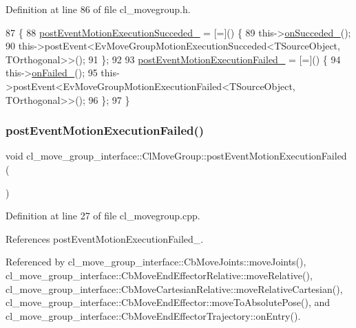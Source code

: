 Definition at line 86 of file cl\+\_\+movegroup.\+h.


\begin{DoxyCode}
87   \{
88     \hyperlink{classcl__move__group__interface_1_1ClMoveGroup_a1e95dacf3393a4e4eff40395e8edfccd}{postEventMotionExecutionSucceded\_} = [=]() \{
89       this->\hyperlink{classcl__move__group__interface_1_1ClMoveGroup_aefc24baaaed9ac7615f4dca20b8a077e}{onSucceded\_}();
90       this->postEvent<EvMoveGroupMotionExecutionSucceded<TSourceObject, TOrthogonal>>();
91     \};
92 
93     \hyperlink{classcl__move__group__interface_1_1ClMoveGroup_ae7ade7ead3390b444ad4f802de1ec62d}{postEventMotionExecutionFailed\_} = [=]() \{
94       this->\hyperlink{classcl__move__group__interface_1_1ClMoveGroup_a3e0ea6acf70a0c527864b712b215033b}{onFailed\_}();
95       this->postEvent<EvMoveGroupMotionExecutionFailed<TSourceObject, TOrthogonal>>();
96     \};
97   \}
\end{DoxyCode}
\mbox{\label{classcl__move__group__interface_1_1ClMoveGroup_a39dc3871d29b2af1ab739057f6ca6daa}} 
\subsubsection{\texorpdfstring{post\+Event\+Motion\+Execution\+Failed()}{postEventMotionExecutionFailed()}}
{\footnotesize\ttfamily void cl\+\_\+move\+\_\+group\+\_\+interface\+::\+Cl\+Move\+Group\+::post\+Event\+Motion\+Execution\+Failed (\begin{DoxyParamCaption}{ }\end{DoxyParamCaption})}



Definition at line 27 of file cl\+\_\+movegroup.\+cpp.



References post\+Event\+Motion\+Execution\+Failed\+\_\+.



Referenced by cl\+\_\+move\+\_\+group\+\_\+interface\+::\+Cb\+Move\+Joints\+::move\+Joints(), cl\+\_\+move\+\_\+group\+\_\+interface\+::\+Cb\+Move\+End\+Effector\+Relative\+::move\+Relative(), cl\+\_\+move\+\_\+group\+\_\+interface\+::\+Cb\+Move\+Cartesian\+Relative\+::move\+Relative\+Cartesian(), cl\+\_\+move\+\_\+group\+\_\+interface\+::\+Cb\+Move\+End\+Effector\+::move\+To\+Absolute\+Pose(), and cl\+\_\+move\+\_\+group\+\_\+interface\+::\+Cb\+Move\+End\+Effector\+Trajectory\+::on\+Entry().


